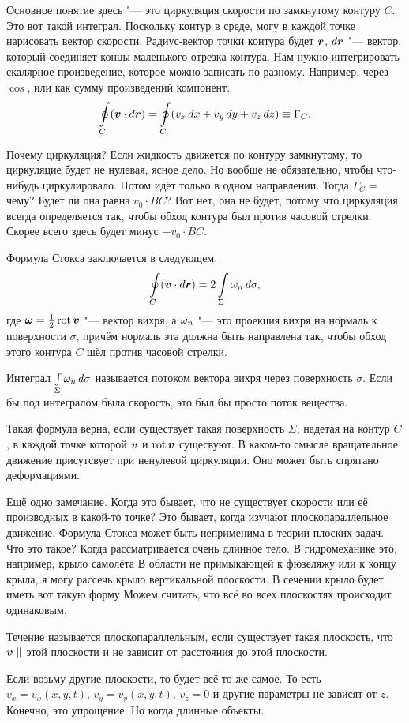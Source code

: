 Основное понятие здесь "--- это циркуляция скорости по замкнутому контуру $C$. Это вот такой интеграл.
Поскольку контур в среде, могу в каждой точке нарисовать вектор скорости. Радиус-вектор точки контура будет $\boldsymbol{r}$, $d\boldsymbol{r}$ "--- вектор, который соединяет концы маленького отрезка контура. Нам нужно интегрировать скалярное произведение, которое можно записать по-разному. Например, через $\cos$, или как сумму произведений компонент.
\[
  \oint\limits_C (\boldsymbol{v}\cdot d\boldsymbol{r}) = \oint\limits_C (v_x\,dx + v_y\,dy+v_z\,dz)\equiv \Gamma_C.
\]

Почему циркуляция? Если жидкость движется по контуру замкнутому, то циркуляцие будет не нулевая, ясное дело. 
Но вообще не обязательно, чтобы что-нибудь циркулировало.
Потом идёт только в одном направлении. Тогда $\Gamma_C=$ чему? Будет ли она равна $v_0\cdot BC$? Вот нет, она не будет, потому что циркуляция всегда определяется так, чтобы обход контура был против часовой стрелки. Скорее всего здесь будет минус $-v_0\cdot BC$.

Формула Стокса заключается в следующем.
\[
  \oint\limits_C (\boldsymbol{v}\cdot d\boldsymbol{r})=2\int\limits_{\Sigma}\omega_n\,d\sigma,
\]
где $\boldsymbol{\omega} = \frac12\operatorname{rot}\boldsymbol{v}$ "--- вектор вихря, а $\omega_n$ "--- это проекция вихря на нормаль к поверхности $\sigma$, причём нормаль эта должна быть направлена так, чтобы обход этого контура $C$ шёл против часовой стрелки.

Интеграл $\int\limits_{\Sigma} \omega_n\,d\sigma$ называется потоком вектора вихря через поверхность $\sigma$. Если бы под интегралом была скорость, это был бы просто поток вещества.

Такая формула верна, если существует такая поверхность $\Sigma$, надетая на контур $C$, в каждой точке которой $\boldsymbol{v} $ и $\operatorname{rot} \boldsymbol{v}$ сущесвуют.
В каком-то смысле вращательное движение присутсвует при ненулевой циркуляции. Оно может быть спрятано деформациями.

Ещё одно замечание. Когда это бывает, что не существует скорости или её производных в какой-то точке? Это бывает, когда изучают плоскопараллельное движение. Формула Стокса может быть неприменима в теории плоских задач. Что это такое? Когда рассматривается очень длинное тело. В гидромеханике это, например, крыло самолёта
В области не примыкающей к фюзеляжу или к концу крыла, я могу рассечь крыло вертикальной плоскости. В сечении крыло будет иметь вот такую форму
Можем считать, что всё во всех плоскостях происходит одинаковым.
\begin{Def}
  Течение называется плоскопараллельным, если существует такая плоскость, что $\boldsymbol{v}\parallel$ этой плоскости и не зависит от расстояния до этой плоскости.
\end{Def}
Если возьму другие плоскости, то будет всё то же самое. То есть $v_x = v_x(x,y,t)$, $v_y = v_y(x,y,t)$, $v_z=0$ и другие параметры не зависят от $z$. Конечно, это упрощение. Но когда длинные объекты.

